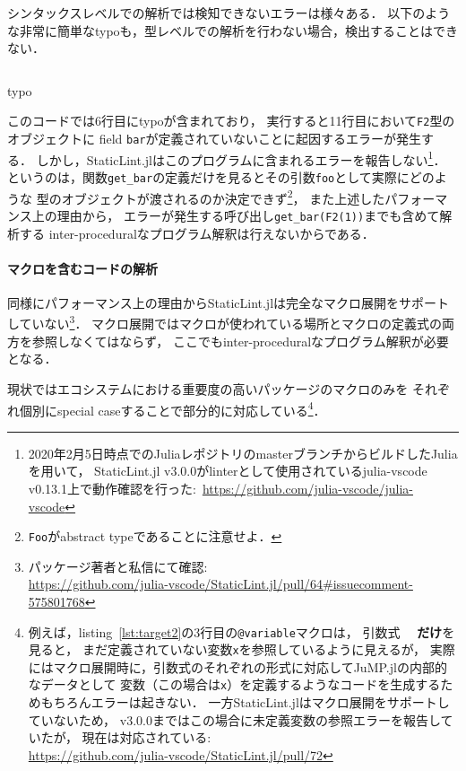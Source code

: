 シンタックスレベルでの解析では検知できないエラーは様々ある．
以下のような非常に簡単なtypoも，型レベルでの解析を行わない場合，検出することはできない．

\begin{listing}[ht]
  \inputminted[frame=lines, linenos, firstnumber=1, firstline=23, lastline=33]{julia}{./src/typo.jl}
  \caption{typo}
  \label{lst:target3}
\end{listing}

このコードでは6行目にtypoが含まれており，
実行すると11行目において\verb|F2|型のオブジェクトに
field \verb|bar|が定義されていないことに起因するエラーが発生する．
しかし，StaticLint.jlはこのプログラムに含まれるエラーを報告しない\footnote{
  2020年2月5日時点でのJuliaレポジトリのmasterブランチからビルドしたJuliaを用いて，
  StaticLint.jl v3.0.0がlinterとして使用されているjulia-vscode v0.13.1上で動作確認を行った:\
  \url{https://github.com/julia-vscode/julia-vscode}
}．
というのは，関数\verb|get_bar|の定義だけを見るとその引数\verb|foo|として実際にどのような
型のオブジェクトが渡されるのか決定できず\footnote{
  \texttt{Foo}がabstract typeであることに注意せよ．
}，
また上述したパフォーマンス上の理由から，
エラーが発生する呼び出し\verb|get_bar(F2(1))|までも含めて解析する
inter-proceduralなプログラム解釈は行えないからである．

\paragraph{マクロを含むコードの解析} \label{paragraph:analyse-code-including-macro}

同様にパフォーマンス上の理由からStaticLint.jlは完全なマクロ展開をサポートしていない\footnote{
  パッケージ著者と私信にて確認:\\
  \url{https://github.com/julia-vscode/StaticLint.jl/pull/64\#issuecomment-575801768}
}．
マクロ展開ではマクロが使われている場所とマクロの定義式の両方を参照しなくてはならず，
ここでもinter-proceduralなプログラム解釈が必要となる．

現状ではエコシステムにおける重要度の高いパッケージのマクロのみを
それぞれ個別にspecial caseすることで部分的に対応している\footnote{
  例えば，listing~\ref{lst:target2}の3行目の\texttt{@variable}マクロは，
  引数式　 \textbf{だけ}を見ると，
  まだ定義されていない変数\texttt{x}を参照しているように見えるが，
  実際にはマクロ展開時に，引数式のそれぞれの形式に対応してJuMP.jlの内部的なデータとして
  変数（この場合は\texttt{x}）を定義するようなコードを生成するためもちろんエラーは起きない．
  一方StaticLint.jlはマクロ展開をサポートしていないため，
  v3.0.0まではこの場合に未定義変数の参照エラーを報告していたが，
  現在は対応されている:\\
  \url{https://github.com/julia-vscode/StaticLint.jl/pull/72}
}．
